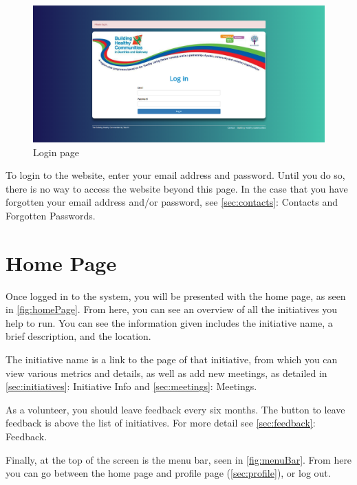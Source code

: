 \documentclass{bhcguides}
\begin{document}
\begin{figure}[h!]
 \centerline{\includegraphics[width=\textwidth, height=\textheight, keepaspectratio]{loginscreen.png}}
 \caption{Login page}
 \label{fig:initialLogin}
\end{figure}

To login to the website, enter your email address and password. Until you do so, there is no way to access the website beyond this page. In the case that you have forgotten your email address and/or password, see \autoref{sec:contacts}: Contacts and Forgotten Passwords.

\pagebreak

\section{Home Page}
\label{sec:homepage}

Once logged in to the system, you will be presented with the home page, as seen in \autoref{fig:homePage}. From here, you can see an overview of all the initiatives you help to run. You can see the information given includes the initiative name, a brief description, and the location.

The initiative name is a link to the page of that initiative, from which you can view various metrics and details, as well as add new meetings, as detailed in \autoref{sec:initiatives}: Initiative Info and \autoref{sec:meetings}: Meetings.

As a volunteer, you should leave feedback every six months. The button to leave feedback is above the list of initiatives. For more detail see \autoref{sec:feedback}: Feedback.

Finally, at the top of the screen is the menu bar, seen in \autoref{fig:menuBar}. From here you can go between the home page and profile page (\autoref{sec:profile}), or log out.
\end{document}
